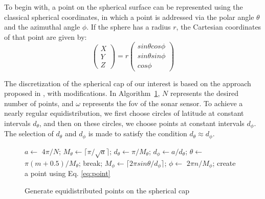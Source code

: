 To begin with, a point on the spherical surface can be represented using the classical spherical coordinates, in which a point is addressed via the polar angle $\theta$ and the azimuthal angle $\phi$. If the sphere has a radius $r$, the Cartesian coordinates of that point are given by:
\begin{equation}
    \label{eq:point}
    \begin{pmatrix}
    X \\ Y \\ Z
    \end{pmatrix} = 
    r 
    \begin{pmatrix}
    sin\theta cos\phi\\
    sin\theta sin\phi\\
    cos\phi
    \end{pmatrix}
\end{equation}

The discretization of the spherical cap of our interest is based on the approach proposed in \cite{equidist}, with modifications. In Algorithm~\ref{alg:equidist}, $N$ represents the desired number of points, and $\omega$ represents the \gls{fov} of the sonar sensor. To achieve a nearly regular equidistribution, we first choose circles of latitude at constant intervals $d_{\theta}$, and then on these circles, we choose points at constant intervals $d_{\phi}$. The selection of $d_{\theta}$ and $d_{\phi}$ is made to satisfy the condition $d_{\theta} \approx d_{\phi}$.

\begin{figure}[t]
\begin{algorithm}[H]
\scriptsize
\captionsetup{font=scriptsize} %
\caption{Generate equidistributed points on the spherical cap}\label{alg:equidist}
\begin{algorithmic} [1]
\State $a \gets$ $4\pi / N$;
\State $M_{\theta} \gets \lceil \pi / \sqrt{a} \rceil$;
\State $d_{\theta} \gets \pi / M_{\theta}$;
\State $d_{\phi} \gets a / d_{\theta}$;
\State $\theta \gets$ $\pi (m + 0.5) / M_{\theta}$;
    \State break;
\EndIf
\State $M_{\phi} \gets \lceil 2\pi sin\theta/ d_{\phi} \rceil$;
        \State $\phi \gets$ $2\pi n / M_{\phi}$;
        \State create a point using Eq. \ref{eq:point}
    \EndFor
\EndFor
\end{algorithmic}
\end{algorithm}
\vspace{-1cm}
\end{figure}

